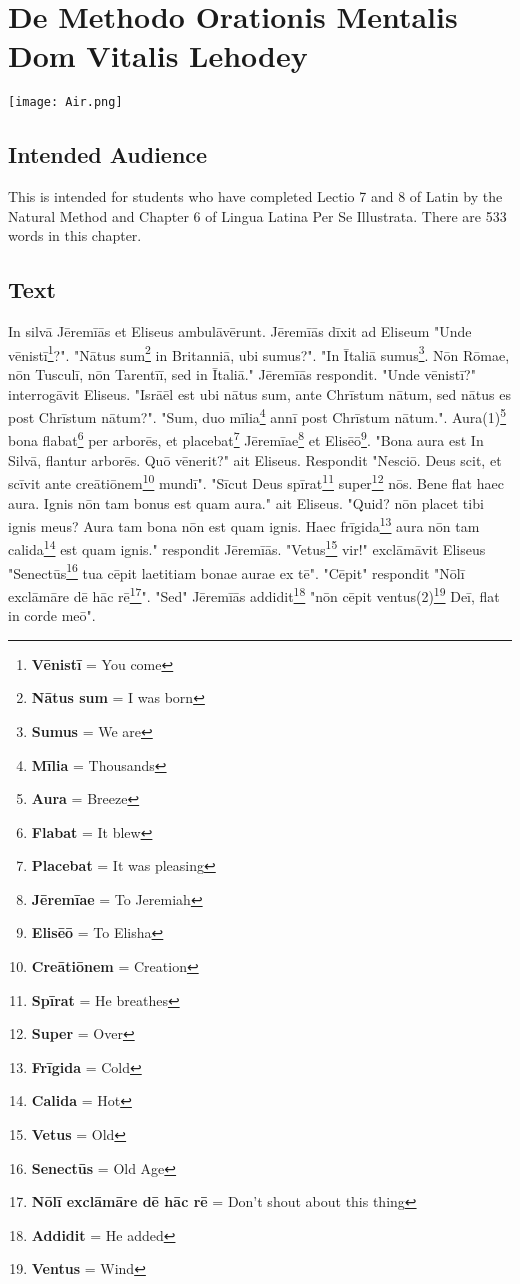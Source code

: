 \chapter{De Methodo Orationis Mentalis Dom Vitalis Lehodey}
\begin{center}
\texttt{[image: Air.png]}
\end{center}

\section{Intended Audience}
This is intended for students who have completed Lectio 7 and 8 of Latin by the Natural Method and Chapter 6 of Lingua Latina Per Se Illustrata. There are 533 words in this chapter.

\section{Text}
In silvā Jēremīās et Eliseus ambulāvērunt. Jēremīās dīxit ad Eliseum "Unde vēnistī\footnote{\textbf{Vēnistī} = You come}?". "Nātus sum\footnote{\textbf{Nātus sum} = I was born} in Britanniā, ubi sumus?". "In Ītaliā sumus\footnote{\textbf{Sumus} = We are}. Nōn Rōmae, nōn Tusculī, nōn Tarentīī, sed in Ītaliā." Jēremīās respondit. "Unde vēnistī?" interrogāvit Eliseus. "Isrāēl est ubi nātus sum, ante Chrīstum nātum, sed nātus es post Chrīstum nātum?". "Sum, duo mīlia\footnote{\textbf{Mīlia} = Thousands} annī post Chrīstum nātum.". Aura(1)\footnote{\textbf{Aura} = Breeze} bona flabat\footnote{\textbf{Flabat} = It blew} per arborēs, et placebat\footnote{\textbf{Placebat} = It was pleasing} Jēremīae\footnote{\textbf{Jēremīae} = To Jeremiah} et Elisēō\footnote{\textbf{Elisēō} = To Elisha}. "Bona aura est In Silvā, flantur arborēs.  Quō vēnerit?" ait Eliseus. Respondit "Nesciō. Deus scit, et scīvit ante creātiōnem\footnote{\textbf{Creātiōnem} = Creation} mundī". "Sīcut Deus spīrat\footnote{\textbf{Spīrat} = He breathes} super\footnote{\textbf{Super} = Over} nōs.  Bene flat haec aura. Ignis nōn tam bonus est quam aura." ait Eliseus. "Quid? nōn placet tibi ignis meus? Aura tam bona nōn est quam ignis. Haec frīgida\footnote{\textbf{Frīgida} = Cold} aura nōn tam calida\footnote{\textbf{Calida} = Hot} est quam ignis." respondit Jēremīās. "Vetus\footnote{\textbf{Vetus} = Old} vir!" exclāmāvit Eliseus "Senectūs\footnote{\textbf{Senectūs} = Old Age} tua cēpit laetitiam bonae aurae ex tē". "Cēpit" respondit "Nōlī exclāmāre dē hāc rē\footnote{\textbf{Nōlī exclāmāre dē hāc rē} = Don't shout about this thing}". "Sed" Jēremīās addidit\footnote{\textbf{Addidit} = He added} "nōn cēpit ventus(2)\footnote{\textbf{Ventus} = Wind} Deī, flat in corde meō". 

